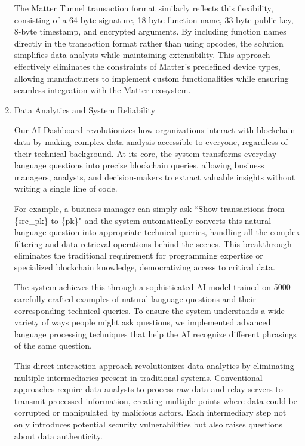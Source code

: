 \documentclass[conference]{IEEEtran}
\begin{document}
\begin{enumerate}[itemsep=2ex, parsep=1ex]
	      The Matter Tunnel transaction format similarly reflects this flexibility, consisting of a 64-byte signature, 18-byte function name, 33-byte public key, 8-byte timestamp, and encrypted arguments. By including function names directly in the transaction format rather than using opcodes, the solution simplifies data analysis while maintaining extensibility. This approach effectively eliminates the constraints of Matter's predefined device types, allowing manufacturers to implement custom functionalities while ensuring seamless integration with the Matter ecosystem.
	      	      	                  
	\item Data Analytics and System Reliability
	      	      	      
	      Our AI Dashboard revolutionizes how organizations interact with blockchain data by making complex data analysis accessible to everyone, regardless of their technical background. At its core, the system transforms everyday language questions into precise blockchain queries, allowing business managers, analysts, and decision-makers to extract valuable insights without writing a single line of code.
	                
	      For example, a business manager can simply ask ``Show transactions from \{src\_pk\} to \{pk\}" and the system automatically converts this natural language question into appropriate technical queries, handling all the complex filtering and data retrieval operations behind the scenes. This breakthrough eliminates the traditional requirement for programming expertise or specialized blockchain knowledge, democratizing access to critical data.
	      
	      The system achieves this through a sophisticated AI model trained on 5000 carefully crafted examples of natural language questions and their corresponding technical queries. To ensure the system understands a wide variety of ways people might ask questions, we implemented advanced language processing techniques that help the AI recognize different phrasings of the same question.
	      
	      This direct interaction approach revolutionizes data analytics by eliminating multiple intermediaries present in traditional systems. Conventional approaches require data analysts to process raw data and relay servers to transmit processed information, creating multiple points where data could be corrupted or manipulated by malicious actors. Each intermediary step not only introduces potential security vulnerabilities but also raises questions about data authenticity.
	      

\end{enumerate}
\end{document}
